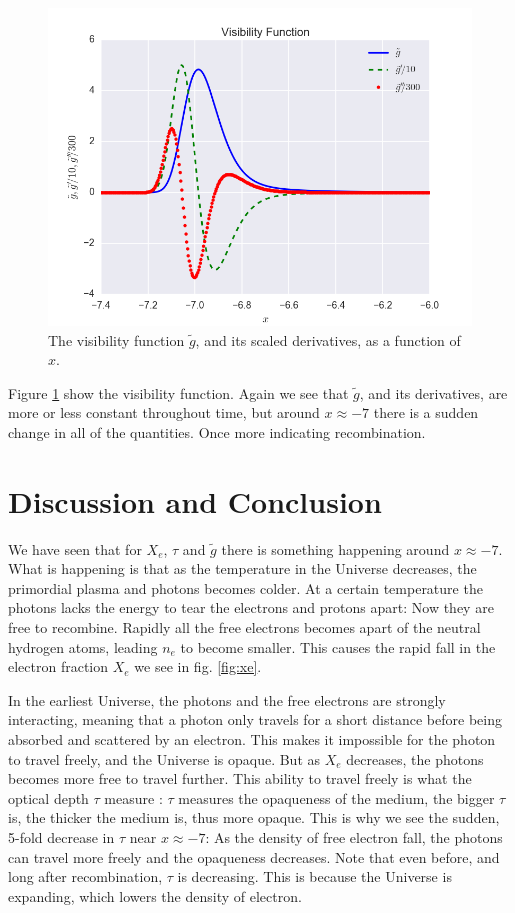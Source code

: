 \documentclass[a4paper,norsk, 10pt]{article}
\begin{document}
\begin{figure}[!htb]
\centering
\includegraphics[scale=0.5]{g.png}
\caption{The visibility function $\tilde{g}$, and its scaled derivatives, as a function of $x$.}\label{fig:g}
\end{figure}

Figure \ref{fig:g} show the visibility function. Again we see that $\tilde{g}$, and its derivatives, are more or less constant throughout time, but around $x\approx -7$ there is a sudden change in all of the quantities. Once more indicating recombination.



\section{Discussion and Conclusion}
We have seen that for $X_e$, $\tau$ and $\tilde{g}$ there is something happening around $x\approx -7$. What is happening is that as the temperature in the Universe decreases, the primordial plasma and photons becomes colder. At a certain temperature the photons lacks the energy to tear the electrons and protons apart: Now they are free to recombine. Rapidly all the free electrons becomes apart of the neutral hydrogen atoms, leading $n_e$ to become smaller. This causes the rapid fall in the electron fraction $X_e$ we see in fig. \ref{fig:xe}.

In the earliest Universe, the photons and the free electrons are strongly interacting, meaning that a photon only travels for a short distance before being absorbed and scattered by an electron. This makes it impossible for the photon to travel freely, and the Universe is opaque. But as $X_e$ decreases, the photons becomes more free to travel further. This ability to travel freely is what the optical depth $\tau$ measure : $\tau$ measures the opaqueness of the medium, the bigger $\tau$ is, the thicker the medium is, thus more opaque. This is why we see the sudden, 5-fold decrease in $\tau$ near $x\approx -7$: As the density of free electron fall, the photons can travel more freely and the opaqueness decreases. Note that even before, and long after recombination, $\tau$ is decreasing. This is because the Universe is expanding, which lowers the density of electron.
\end{document}
